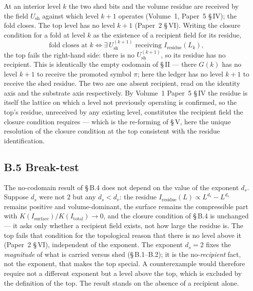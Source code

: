 \documentclass[11pt,oneside]{report}
\theoremstyle{definition}
\theoremstyle{remark}
\begin{document}
At an interior level \ensuremath{k} the two shed bits and the volume residue are received by the
field \ensuremath{U_{\mathrm{sh}}} against which level \ensuremath{k{+}1} operates (Volume~1, Paper~5
\S\,IV); the fold closes. The top level has no level \ensuremath{k{+}1} (Paper~2 \S\,VI). Writing the
closure condition for a fold at level \ensuremath{k} as the existence of a recipient field for its
residue,
\[
  \text{fold closes at } k \iff \exists\, U_{\mathrm{sh}}^{(k+1)} \text{ receiving } I_{\mathrm{residue}}(L_k),
\]
the top fails the right-hand side: there is no \ensuremath{U_{\mathrm{sh}}^{(k+1)}}, so its residue
has no recipient. This is identically the empty codomain of \S\,II --- there \ensuremath{G(k)} has no
level \ensuremath{k{+}1} to receive the promoted symbol \ensuremath{\pi}; here the ledger has no level
\ensuremath{k{+}1} to receive the shed residue. The two are one absent recipient, read on the
identity axis and the substrate axis respectively. By Volume~1 Paper~5 \S\,IV the residue is itself
the lattice on which a level not previously operating is confirmed, so the top's residue, unreceived
by any existing level, constitutes the recipient field the closure condition requires --- which is
the re-forming of \S\,V, here the unique resolution of the closure condition at the top consistent
with the residue identification.

\subsection*{B.5 Break-test}

The no-codomain result of \S\,B.4 does not depend on the value of the exponent \ensuremath{d_s}.
Suppose \ensuremath{d_s} were not \ensuremath{2} but any \ensuremath{d_s < d_v}: the residue
\ensuremath{I_{\mathrm{residue}}(L) \propto L^{d_v} - L^{d_s}} remains positive and volume-dominant,
the surface remains the compressible part with
\ensuremath{K(I_{\mathrm{surface}})/K(I_{\mathrm{total}}) \to 0}, and the closure condition of \S\,B.4
is unchanged --- it asks only whether a recipient field exists, not how large the residue is. The
top fails that condition for the topological reason that there is no level above it (Paper~2
\S\,VI), independent of the exponent. The exponent \ensuremath{d_s = 2} fixes the \emph{magnitude}
of what is carried versus shed (\S\,B.1--B.2); it is the no-\emph{recipient} fact, not the
exponent, that makes the top special. A counterexample would therefore require not a different
exponent but a level above the top, which is excluded by the definition of the top. The result
stands on the absence of a recipient alone.
\end{document}
